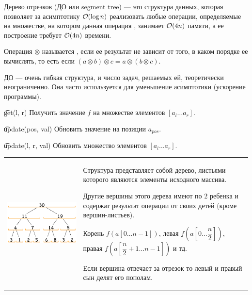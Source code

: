 
Дерево отрезков (ДО или segment tree) --- это структура данных, которая позволяет за асимптотику $\mathcal{O}(\log n)$ реализовать любые операции, определяемые на множестве, на котором данная операция {}, занимает $\mathcal{O}(4n)$ памяти, а ее построение требует $\mathcal{O}(4n)$ времени.

\down
Операция $\otimes$ называется {}, если ее результат не зависит от того, в каком порядке ее вычислять, то есть если $(a \otimes b) \otimes c = a \otimes (b \otimes c)$.

\down
ДО — очень гибкая структура, и число задач, решаемых ей, теоретически неограниченно. Она часто используется для уменьшение асимптотики (ускорение программы).



\t{get(l, r)} Получить значение $f$ на множестве элементов $[a_l \ldots a_r]$.

\t{update(pos, val)} Обновить значение на позиции $a_{pos}$.

\t{update(l, r, val)} Обновить множество элементов $[a_l \ldots a_r]$.



\begin{tabular}{cm{15cm}}
	\begin{minipage}{4cm}
		\includegraphics[scale=0.5]{do_edu.png}
	\end{minipage} 
	&
Структура представляет собой дерево, листьями которого являются элементы исходного массива. 

Другие вершины этого дерева имеют по $2$ ребенка и содержат результат операции от своих детей (кроме вершин-листьев).

Корень $f(a[0 \ldots n - 1])$, левая $f(a[0 \ldots \dfrac{n}{2}])$, правая $f(a[\dfrac{n}{2} + 1 \ldots n - 1])$ и тд.

Если вершина отвечает за отрезок то левый и правый сын делят его пополам.
\end{tabular}


